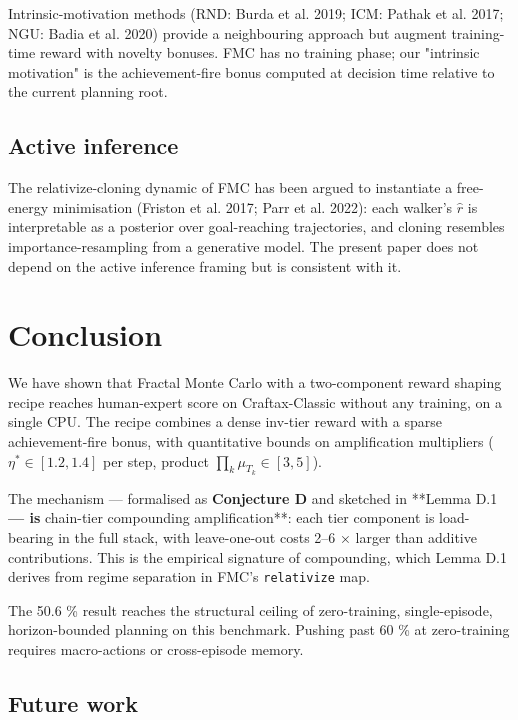 \documentclass[11pt,letterpaper]{article}
\begin{document}
Intrinsic-motivation methods (RND: Burda et al. 2019; ICM: Pathak et
al. 2017; NGU: Badia et al. 2020) provide a neighbouring approach but
augment training-time reward with novelty bonuses. FMC has no training
phase; our "intrinsic motivation" is the achievement-fire bonus
computed at decision time relative to the current planning root.

\subsection{Active inference}

The relativize-cloning dynamic of FMC has been argued to instantiate a
free-energy minimisation (Friston et al. 2017; Parr et al. 2022): each
walker's $\widehat{r}$ is interpretable as a posterior over goal-reaching
trajectories, and cloning resembles importance-resampling from a
generative model. The present paper does not depend on the active
inference framing but is consistent with it.



\section{Conclusion}

We have shown that Fractal Monte Carlo with a two-component reward
shaping recipe reaches human-expert score on Craftax-Classic without
any training, on a single CPU. The recipe combines a dense inv-tier
reward with a sparse achievement-fire bonus, with quantitative bounds
on amplification multipliers ($\eta^* \in [1.2, 1.4]$ per step, product
$\prod_k \mu_{T_k} \in [3, 5]$).

The mechanism — formalised as \textbf{Conjecture D} and sketched in **Lemma
D.1\textbf{ — is }chain-tier compounding amplification**: each tier
component is load-bearing in the full stack, with leave-one-out costs
2–6 × larger than additive contributions. This is the empirical
signature of compounding, which Lemma D.1 derives from regime
separation in FMC's \texttt{relativize} map.

The 50.6 \% result reaches the structural ceiling of zero-training,
single-episode, horizon-bounded planning on this benchmark. Pushing
past 60 \% at zero-training requires macro-actions or cross-episode
memory.

\subsection{Future work}
\end{document}
